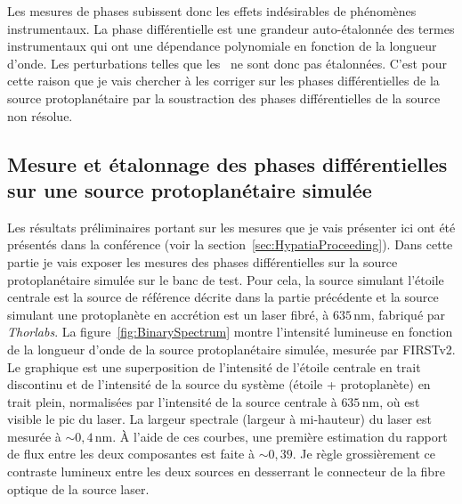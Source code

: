 Les mesures de phases subissent donc les effets indésirables de phénomènes instrumentaux. La phase différentielle est une grandeur auto-étalonnée des termes instrumentaux qui ont une dépendance polynomiale en fonction de la longueur d'onde. Les perturbations telles que les \wiggles~ne sont donc pas étalonnées. C'est pour cette raison que je vais chercher à les corriger sur les phases différentielles de la source protoplanétaire par la soustraction des phases différentielles de la source non résolue.


\subsection{Mesure et étalonnage des phases différentielles sur une source protoplanétaire simulée}
\label{sec:PhaseDiffMesure}

Les résultats préliminaires portant sur les mesures que je vais présenter ici ont été présentés dans la conférence \cite{barjot2022} (voir la section~\ref{sec:HypatiaProceeding}). Dans cette partie je vais exposer les mesures des phases différentielles sur la source protoplanétaire simulée sur le banc de test. Pour cela, la source simulant l'étoile centrale est la source de référence décrite dans la partie précédente et la source simulant une protoplanète en accrétion est un laser fibré, à $635 \,$nm, fabriqué par \textit{Thorlabs}. La figure~\ref{fig:BinarySpectrum} montre l'intensité lumineuse en fonction de la longueur d'onde de la source protoplanétaire simulée, mesurée par \ac{FIRSTv2}. Le graphique est une superposition de l'intensité de l'étoile centrale en trait discontinu et de l'intensité de la source du système (étoile + protoplanète) en trait plein, normalisées par l'intensité de la source centrale à $635 \,$nm, où est visible le pic du laser. La largeur spectrale (largeur à mi-hauteur) du laser est mesurée à $\sim 0,4 \,$nm. À l'aide de ces courbes, une première estimation du rapport de flux entre les deux composantes est faite à $\sim 0,39$. Je règle grossièrement ce contraste lumineux entre les deux sources en desserrant le connecteur de la fibre optique de la source laser.

